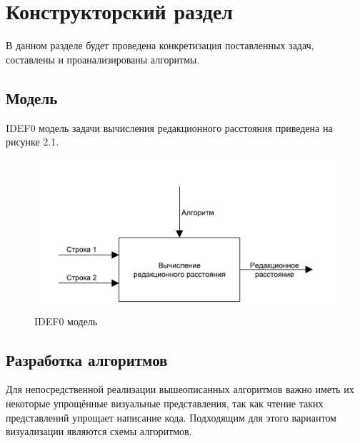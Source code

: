 \chapter{Конструкторский раздел}
\label{cha:design}

В данном разделе будет проведена конкретизация поставленных задач, составлены и проанализированы алгоритмы.

\section{Модель}
IDEF0 модель задачи вычисления редакционного расстояния приведена на рисунке 2.1.
\begin{figure}
    \centering
    \includegraphics{pdf/mainIdef0.pdf}
    \caption{IDEF0 модель}
\end{figure}

\section{Разработка алгоритмов}
Для непосредственной реализации вышеописанных алгоритмов важно иметь их некоторые упрощённые визуальные представления, так как чтение таких представлений упрощает написание кода. Подходящим для этого вариантом визуализации являются схемы алгоритмов.

